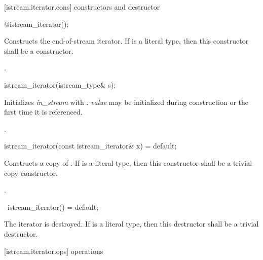 [istream.iterator.cons]{ constructors and destructor}


%
\begin{itemdecl}
@\seebelow@ istream_iterator();
\end{itemdecl}

\begin{itemdescr}
\pnum
\effects
Constructs the end-of-stream iterator. If  is a literal type, then this
constructor shall be a  constructor.

\pnum
\postcondition {}.
\end{itemdescr}


%
\begin{itemdecl}
istream_iterator(istream_type& s);
\end{itemdecl}

\begin{itemdescr}
\pnum
\effects
Initializes \textit{in_stream} with . \textit{value} may be initialized during
construction or the first time it is referenced.

\pnum
\postcondition {}.
\end{itemdescr}

%
\begin{itemdecl}
istream_iterator(const istream_iterator& x) = default;
\end{itemdecl}

\begin{itemdescr}
\pnum
\effects
Constructs a copy of . If  is a literal type, then this constructor shall be a trivial copy constructor.

\pnum
\postcondition {}.
\end{itemdescr}

%
\begin{itemdecl}
~istream_iterator() = default;
\end{itemdecl}

\begin{itemdescr}
\pnum
\effects
The iterator is destroyed. If  is a literal type, then this destructor shall be a trivial destructor.
\end{itemdescr}

[istream.iterator.ops]{ operations}

